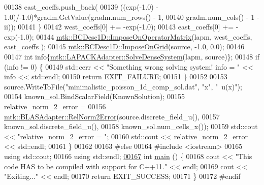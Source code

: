 \begin{DoxyCode}
00138     east\_coeffs.push\_back(
00139       ((exp(-1.0) - 1.0)/-1.0)*gradm.GetValue(gradm.num\_rows() - 1,
00140                                               gradm.num\_cols() - 1 - ii));
00141   \}
00142   west\_coeffs[0] += -exp(-1.0);
00143   east\_coeffs[0] += -exp(-1.0);
00144   \hyperlink{classmtk_1_1BCDesc1D_a5e5dcda1780b9aa404e836c4c27ac08f}{mtk::BCDesc1D::ImposeOnOperatorMatrix}(lapm, west\_coeffs, east\_coeffs
      );
00145   \hyperlink{classmtk_1_1BCDesc1D_a79a659c6a6333af8e51c463cf1ecb0b7}{mtk::BCDesc1D::ImposeOnGrid}(source, -1.0, 0.0);
00146 
00147   \textcolor{keywordtype}{int} info\{\hyperlink{classmtk_1_1LAPACKAdapter_a7428bccf74fd4a4af68fb7233846da22}{mtk::LAPACKAdapter::SolveDenseSystem}(lapm, source)\};
00148   \textcolor{keywordflow}{if} (info != 0) \{
00149     std::cerr << \textcolor{stringliteral}{"Something wrong solving system! info = "} << info << std::endl;
00150     \textcolor{keywordflow}{return} EXIT\_FAILURE;
00151   \}
00152 
00153   source.WriteToFile(\textcolor{stringliteral}{"minimalistic\_poisson\_1d\_comp\_sol.dat"}, \textcolor{stringliteral}{"x"}, \textcolor{stringliteral}{"~u(x)"});
00154   known\_sol.BindScalarField(KnownSolution);
00155   relative\_norm\_2\_error =
00156     \hyperlink{classmtk_1_1BLASAdapter_af2ac5691f45e67d6e26186b071119ec4}{mtk::BLASAdapter::RelNorm2Error}(source.discrete\_field\_u(),
00157                                     known\_sol.discrete\_field\_u(),
00158                                     known\_sol.num\_cells\_x());
00159   std::cout << \textcolor{stringliteral}{"relative\_norm\_2\_error = "};
00160   std::cout << relative\_norm\_2\_error << std::endl;
00161 \}
00162 
00163 \textcolor{preprocessor}{#else}
00164 \textcolor{preprocessor}{#include <iostream>}
00165 \textcolor{keyword}{using} std::cout;
00166 \textcolor{keyword}{using} std::endl;
\hypertarget{minimalistic__poisson__1d_8cc_source_l00167}{}\hyperlink{minimalistic__poisson__1d_8cc_ae66f6b31b5ad750f1fe042a706a4e3d4}{00167} \textcolor{keywordtype}{int} \hyperlink{minimalistic__poisson__1d_8cc_ae66f6b31b5ad750f1fe042a706a4e3d4}{main} () \{
00168   cout << \textcolor{stringliteral}{"This code HAS to be compiled with support for C++11."} << endl;
00169   cout << \textcolor{stringliteral}{"Exiting..."} << endl;
00170   \textcolor{keywordflow}{return} EXIT\_SUCCESS;
00171 \}
00172 \textcolor{preprocessor}{#endif}
\end{DoxyCode}
